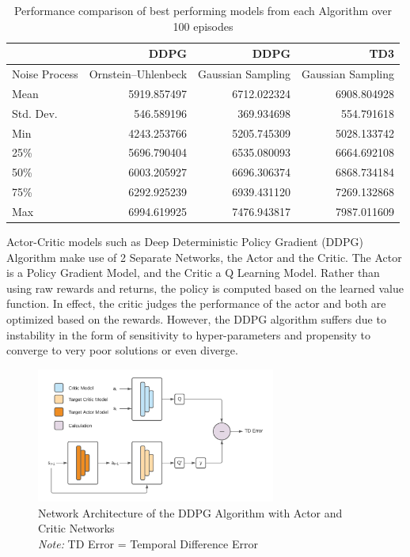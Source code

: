 \documentclass{article}
\begin{document}
\begin{table}[h!]
    \centering
    \begin{tabular}{ | l | r | r | r | }
        \hline
        {}            & DDPG               & DDPG              & TD3               \\
        \hline
        Noise Process & Ornstein–Uhlenbeck & Gaussian Sampling & Gaussian Sampling \\
        Mean          & 5919.857497        & 6712.022324       & 6908.804928       \\
        Std. Dev.     & 546.589196         & 369.934698        & 554.791618        \\
        Min           & 4243.253766        & 5205.745309       & 5028.133742       \\
        25\%          & 5696.790404        & 6535.080093       & 6664.692108       \\
        50\%          & 6003.205927        & 6696.306374       & 6868.734184       \\
        75\%          & 6292.925239        & 6939.431120       & 7269.132868       \\
        Max           & 6994.619925        & 7476.943817       & 7987.011609       \\
        \hline
    \end{tabular}
    \caption{Performance comparison of best performing models from each Algorithm over 100 episodes}
    \label{table:rl_algo_perf_comp}

\end{table}


Actor-Critic models such as Deep Deterministic Policy Gradient (DDPG) Algorithm \cite{lillicrap_continuous_2019} make use of 2 Separate Networks, the Actor and the Critic. The Actor is a Policy Gradient Model, and the Critic a Q Learning Model. Rather than using raw rewards and returns, the policy is computed based on the learned value function. In effect, the critic judges the performance of the actor and both are optimized based on the rewards. However, the DDPG algorithm suffers due to instability in the form of sensitivity to hyper-parameters and propensity to converge to very poor solutions or even diverge.

\begin{figure}[h]
    \centering
    \includegraphics[width=0.7\textwidth]{DDPG.png}
    \caption{Network Architecture of the DDPG Algorithm with Actor and Critic Networks \\ \emph{Note:} TD Error = Temporal Difference Error}
\end{figure}
\end{document}
